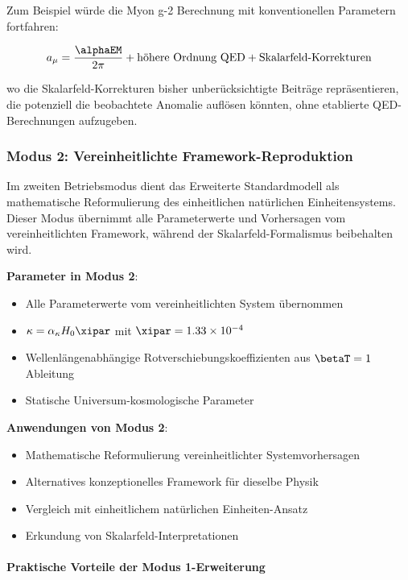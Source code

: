 	Zum Beispiel würde die Myon g-2 Berechnung mit konventionellen Parametern fortfahren:
	
	\begin{equation}
		a_\mu = \frac{\alphaEM}{2\pi} + \text{höhere Ordnung QED} + \text{Skalarfeld-Korrekturen}
	\end{equation}
	
	wo die Skalarfeld-Korrekturen bisher unberücksichtigte Beiträge repräsentieren, die potenziell die beobachtete Anomalie auflösen könnten, ohne etablierte QED-Berechnungen aufzugeben.
	
	\subsubsection{Modus 2: Vereinheitlichte Framework-Reproduktion}
	\label{subsubsec:mode2_unified_reproduction}
	
	Im zweiten Betriebsmodus dient das Erweiterte Standardmodell als mathematische Reformulierung des einheitlichen natürlichen Einheitensystems. Dieser Modus übernimmt alle Parameterwerte und Vorhersagen vom vereinheitlichten Framework, während der Skalarfeld-Formalismus beibehalten wird.
	
	\textbf{Parameter in Modus 2}:
	\begin{itemize}
		\item Alle Parameterwerte vom vereinheitlichten System übernommen
		\item $\kappa = \alpha_\kappa H_0 \xipar$ mit $\xipar = 1.33 \times 10^{-4}$
		\item Wellenlängenabhängige Rotverschiebungskoeffizienten aus $\betaT = 1$ Ableitung
		\item Statische Universum-kosmologische Parameter
	\end{itemize}
	
	\textbf{Anwendungen von Modus 2}:
	\begin{itemize}
		\item Mathematische Reformulierung vereinheitlichter Systemvorhersagen
		\item Alternatives konzeptionelles Framework für dieselbe Physik
		\item Vergleich mit einheitlichem natürlichen Einheiten-Ansatz
		\item Erkundung von Skalarfeld-Interpretationen
	\end{itemize}
	
	\paragraph{Praktische Vorteile der Modus 1-Erweiterung}
	\label{par:practical_advantages_mode1}
	

